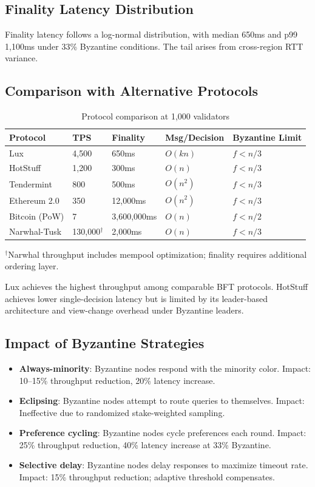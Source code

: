 \subsection{Finality Latency Distribution}

Finality latency follows a log-normal distribution, with median 650ms and p99 1,100ms under
33\% Byzantine conditions. The tail arises from cross-region RTT variance.

\subsection{Comparison with Alternative Protocols}

\begin{table}[h]
\centering
\caption{Protocol comparison at 1,000 validators}
\label{tab:comparison}
\begin{tabular}{@{}lllll@{}}
\toprule
Protocol & TPS & Finality & Msg/Decision & Byzantine Limit \\
\midrule
Lux & 4,500 & 650ms & $O(kn)$ & $f < n/3$ \\
HotStuff & 1,200 & 300ms & $O(n)$ & $f < n/3$ \\
Tendermint & 800 & 500ms & $O(n^2)$ & $f < n/3$ \\
Ethereum 2.0 & 350 & 12,000ms & $O(n^2)$ & $f < n/3$ \\
Bitcoin (PoW) & 7 & 3,600,000ms & $O(n)$ & $f < n/2$ \\
Narwhal-Tusk & 130,000$^\dagger$ & 2,000ms & $O(n)$ & $f < n/3$ \\
\bottomrule
\end{tabular}
\smallskip
\newline $^\dagger$Narwhal throughput includes mempool optimization; finality requires additional ordering layer.
\end{table}

Lux achieves the highest throughput among comparable BFT protocols. HotStuff achieves
lower single-decision latency but is limited by its leader-based architecture and
view-change overhead under Byzantine leaders.

\subsection{Impact of Byzantine Strategies}

\begin{itemize}
\item \textbf{Always-minority}: Byzantine nodes respond with the minority color.
Impact: 10--15\% throughput reduction, 20\% latency increase.
\item \textbf{Eclipsing}: Byzantine nodes attempt to route queries to themselves.
Impact: Ineffective due to randomized stake-weighted sampling.
\item \textbf{Preference cycling}: Byzantine nodes cycle preferences each round.
Impact: 25\% throughput reduction, 40\% latency increase at 33\% Byzantine.
\item \textbf{Selective delay}: Byzantine nodes delay responses to maximize timeout rate.
Impact: 15\% throughput reduction; adaptive threshold compensates.
\end{itemize}

